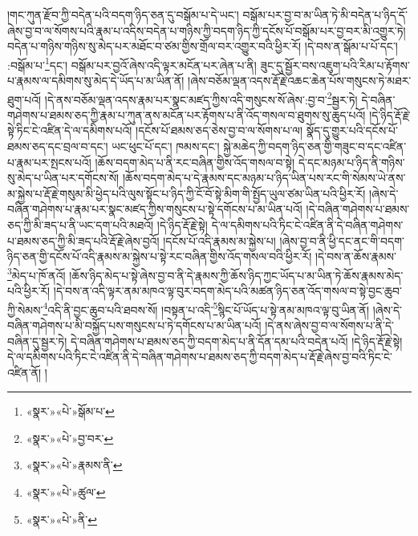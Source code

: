 །གང་ཀུན་རྫོབ་ཀྱི་བདེན་པའི་བདག་ཉིད་ཅན་དུ་བསྒོམ་པ་དེ་ཡང་། བསྒོམ་པར་བྱ་བ་མ་ཡིན་ཏེ་མི་བདེན་པ་ཉིད་དོ་ཞེས་བྱ་བ་ལ་སོགས་པའི་རྣམ་པ་འདིས་བདེན་པ་གཉིས་ཀྱི་བདག་ཉིད་ཀྱི་དངོས་པོ་བསྒོམ་པར་བྱ་བར་མི་འགྱུར་ཏེ། བདེན་པ་གཉིས་གཉིས་སུ་མེད་པར་མཐོང་བ་ཙམ་གྱིས་གྲོལ་བར་འགྱུར་བའི་ཕྱིར་རོ། །དེ་བས་ན་སྒོམ་པ་པོ་དང་། :བསྒོམ་པ་\footnote{«སྣར་»«པེ་»སྒོམ་པ་}དང་། བསྒོམ་པར་བྱའོ་ཞེས་འདི་ལྟར་མངོན་པར་ཞེན་པ་ནི། ཟུང་དུ་སྦྱོར་བས་འཇུག་པའི་རིམ་པ་རྟོགས་པ་རྣམས་ལ་དམིགས་སུ་མེད་དེ་ཡོད་པ་མ་ཡིན་ནོ། །ཞེས་བཅོམ་ལྡན་འདས་རྡོ་རྗེ་འཆང་ཆེན་པོས་གསུངས་ཏེ་མཐར་ཐུག་པའོ། །དེ་ནས་བཅོམ་ལྡན་འདས་རྣམ་པར་སྣང་མཛད་ཀྱིས་འདི་གསུངས་སོ་ཞེས་:བྱ་བ་\footnote{«སྣར་»«པེ་»བྱ་བར་}སྦྱར་ཏེ། དེ་བཞིན་གཤེགས་པ་ཐམས་ཅད་ཀྱི་རྣམ་པ་ཀུན་ནས་མངོན་པར་རྟོགས་པ་ནི་འོད་གསལ་བ་ཐུགས་སུ་ཆུད་པའོ། །དེ་ཉིད་རྡོ་རྗེ་སྟེ་ཏིང་ངེ་འཛིན་དེ་ལ་དམིགས་པའོ། །དངོས་པོ་ཐམས་ཅད་ཅེས་བྱ་བ་ལ་སོགས་པ་ལ། སྣོད་དུ་གྱུར་པའི་དངོས་པོ་ཐམས་ཅད་དང་བྲལ་བ་དང་། ཡང་ཕུང་པོ་དང་། ཁམས་དང་། སྐྱེ་མཆེད་ཀྱི་བདག་ཉིད་ཅན་གྱི་གཟུང་བ་དང་འཛིན་པ་རྣམ་པར་སྤངས་པའོ། །ཆོས་བདག་མེད་པ་ནི་རང་བཞིན་གྱིས་འོད་གསལ་བ་སྟེ། དེ་དང་མཉམ་པ་ཉིད་ནི་གཉིས་སུ་མེད་པ་ཡིན་པར་དགོངས་སོ། །ཆོས་བདག་མེད་པ་དེ་རྣམས་དང་མཉམ་པ་ཉིད་ཡིན་པས་རང་གི་སེམས་ཡེ་ནས་མ་སྐྱེས་པ་རྡོ་རྗེ་གསུམ་མི་ཕྱེད་པའི་ལུས་སྟོང་པ་ཉིད་ཀྱི་ངོ་བོ་སྟེ་མིག་གི་སྤྱོད་ཡུལ་ཙམ་ཡིན་པའི་ཕྱིར་རོ། །ཞེས་དེ་བཞིན་གཤེགས་པ་རྣམ་པར་སྣང་མཛད་ཀྱིས་གསུངས་པ་སྟེ་དགོངས་པ་མ་ཡིན་པའོ། །དེ་བཞིན་གཤེགས་པ་ཐམས་ཅད་ཀྱི་མི་ཟད་པ་ནི་ཡང་དག་པའི་མཐའོ། །དེ་ཉིད་རྡོ་རྗེ་སྟེ། དེ་ལ་དམིགས་པའི་ཏིང་ངེ་འཛིན་ནི་དེ་བཞིན་གཤེགས་པ་ཐམས་ཅད་ཀྱི་མི་ཟད་པའི་རྡོ་རྗེ་ཞེས་བྱའོ། །དངོས་པོ་འདི་རྣམས་མ་སྐྱེས་པ། །ཞེས་བྱ་བ་ནི་ཕྱི་དང་ནང་གི་བདག་ཉིད་ཅན་གྱི་དངོས་པོ་འདི་རྣམས་མ་སྐྱེས་པ་སྟེ་རང་བཞིན་གྱིས་འོད་གསལ་བའི་ཕྱིར་རོ། །དེ་བས་ན་ཆོས་རྣམས་\footnote{«སྣར་»«པེ་»རྣམས་ནི་}མེད་པ་ཁོ་ནའོ། །ཆོས་ཉིད་མེད་པ་སྟེ་ཞེས་བྱ་བ་ནི་དེ་རྣམས་ཀྱི་ཆོས་ཉིད་ཀྱང་ཡོད་པ་མ་ཡིན་ཏེ་ཆོས་རྣམས་མེད་པའི་ཕྱིར་རོ། །དེ་བས་ན་འདི་ལྟར་ནམ་མཁའ་ལྟ་བུར་བདག་མེད་པའི་མཚན་ཉིད་ཅན་འོད་གསལ་བ་སྟེ་བྱང་ཆུབ་ཀྱི་སེམས་\footnote{«སྣར་»«པེ་»ཚུལ་}འདི་ནི་བྱང་ཆུབ་པའི་ཐབས་སོ། །བསྟན་པ་འདི་\footnote{«སྣར་»«པེ་»ནི་}སྙིང་པོ་ཡོད་པ་སྟེ་ནམ་མཁའ་ལྟ་བུ་ཡིན་ནོ། །ཞེས་དེ་བཞིན་གཤེགས་པ་མི་བསྐྱོད་པས་གསུངས་པ་ཏེ་དགོངས་པ་མ་ཡིན་པའོ། །དེ་ནས་ཞེས་བྱ་བ་ལ་སོགས་པ་ནི་དེ་བཞིན་དུ་སྦྱར་ཏེ། དེ་བཞིན་གཤེགས་པ་ཐམས་ཅད་ཀྱི་བདག་མེད་པ་ནི་དོན་དམ་པའི་བདེན་པའོ། །དེ་ཉིད་རྡོ་རྗེ་སྟེ། དེ་ལ་དམིགས་པའི་ཏིང་ངེ་འཛིན་ནི་དེ་བཞིན་གཤེགས་པ་ཐམས་ཅད་ཀྱི་བདག་མེད་པ་རྡོ་རྗེ་ཞེས་བྱ་བའི་ཏིང་ངེ་འཛིན་ནོ། །
